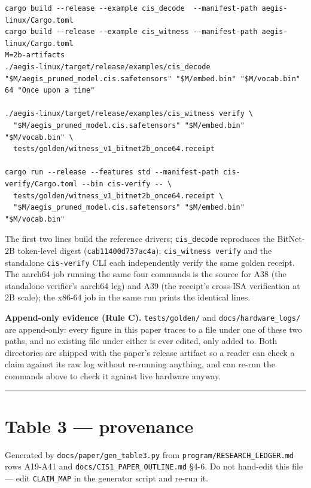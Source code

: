 \documentclass[11pt]{article}
\begin{document}
\begin{Verbatim}[breaklines=true,breakanywhere=true,fontsize=\small]
cargo build --release --example cis_decode  --manifest-path aegis-linux/Cargo.toml
cargo build --release --example cis_witness --manifest-path aegis-linux/Cargo.toml
M=2b-artifacts
./aegis-linux/target/release/examples/cis_decode "$M/aegis_pruned_model.cis.safetensors" "$M/embed.bin" "$M/vocab.bin" 64 "Once upon a time"

./aegis-linux/target/release/examples/cis_witness verify \
  "$M/aegis_pruned_model.cis.safetensors" "$M/embed.bin" "$M/vocab.bin" \
  tests/golden/witness_v1_bitnet2b_once64.receipt

cargo run --release --features std --manifest-path cis-verify/Cargo.toml --bin cis-verify -- \
  tests/golden/witness_v1_bitnet2b_once64.receipt \
  "$M/aegis_pruned_model.cis.safetensors" "$M/embed.bin" "$M/vocab.bin"
\end{Verbatim}

The first two lines build the reference drivers; \texttt{cis\_decode} reproduces the BitNet-2B token-level
digest (\texttt{cab11400d737ac4a}); \texttt{cis\_witness\ verify} and the standalone \texttt{cis-verify} CLI each
independently verify the same golden receipt. The aarch64 job running the same four commands is
the source for A38 (the standalone verifier's aarch64 leg) and A39 (the receipt's cross-ISA
verification at 2B scale); the x86-64 job in the same run prints the identical lines.

\textbf{Append-only evidence (Rule C).} \texttt{tests/golden/} and \texttt{docs/hardware\_logs/}
are append-only: every figure in this paper traces to a file under one of
these two paths, and no existing file under either is ever edited, only
added to. Both directories are shipped with the paper's release artifact so
a reader can check a claim against its raw log without re-running anything,
and can re-run the commands above to check it against live hardware anyway.

\begin{center}\rule{0.5\linewidth}{0.5pt}\end{center}

\section{Table 3 --- provenance}\label{table-3-provenance}

Generated by \texttt{docs/paper/gen\_table3.py} from \texttt{program/RESEARCH\_LEDGER.md} rows
A19-A41 and \texttt{docs/CIS1\_PAPER\_OUTLINE.md} §4-6. Do not hand-edit this file ---
edit \texttt{CLAIM\_MAP} in the generator script and re-run it.
\end{document}
